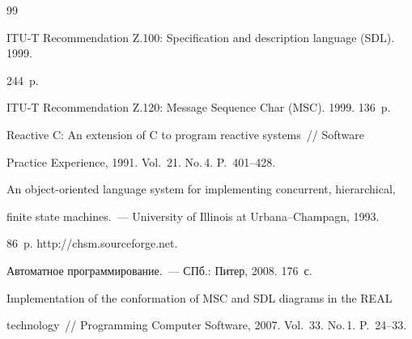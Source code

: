 {\small\frenchspacing


{%




\begin{thebibliography}{99}     







ITU-T Recommendation Z.100: Specification and description language (SDL). 1999.  


244~p.







 ITU-T Recommendation Z.120: Message Sequence Char (MSC).  1999. 136~p.









Reactive C: An extension of C to program reactive systems~/\!\!/ Software 


Practice Experience, 1991.  Vol.~21. No.\,4. P.~401--428.









An object-oriented language system for implementing concurrent, hierarchical, 


finite state machines.~--- University of Illinois at Urbana--Champagn, 1993. 


86~p. {\sf  http://chsm.sourceforge.net}. 









Автоматное программирование.~--- СПб.: Питер, 2008. 176~с.









Implementation of the conformation of MSC and SDL diagrams in the REAL 


technology~/\!\!/ Programming Computer Software, 2007.  Vol.~33. No.\,1. P.~24--33.






\end{thebibliography}}}
